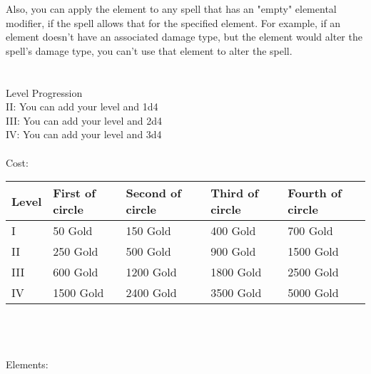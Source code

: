 Also, you can apply the element to any spell that has an "empty" elemental modifier, if the spell allows that for the specified element. For example, if an element doesn't have an associated damage type, but the element would alter the spell's damage type,  you can't use that element to alter the spell.\\
\\
\\
Level Progression\\
II: You can add your level and 1d4\\
III: You can add your level and 2d4\\
IV: You can add your level and 3d4\\
\\
Cost:\\
\begin{tabular}{l | p{2.5cm} | p{2.5cm} | p{2.5cm} | p{2.5cm}}
	Level & First of circle & Second of circle & Third of circle & Fourth of circle \\ \hline
	I & 50 Gold & 150 Gold & 400 Gold & 700 Gold\\
	II & 250 Gold & 500 Gold & 900 Gold & 1500 Gold\\
	III & 600 Gold & 1200 Gold & 1800 Gold & 2500 Gold\\
	IV & 1500 Gold & 2400 Gold & 3500 Gold & 5000 Gold\\
\end{tabular}
\\
\\
\\
Elements:\\
